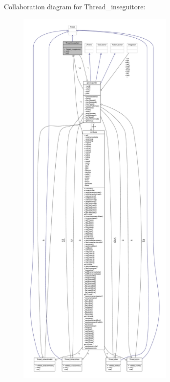Collaboration diagram for Thread\+\_\+inseguitore\+:
\nopagebreak
\begin{figure}[H]
\begin{center}
\leavevmode
\includegraphics[height=550pt]{classcargame_1_1_thread__inseguitore__coll__graph}
\end{center}
\end{figure}
